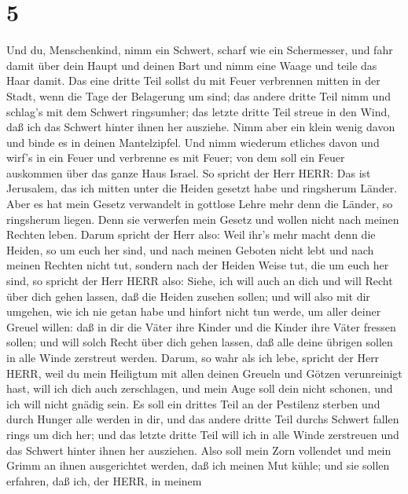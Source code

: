 \hypertarget{section-4}{%
\section{5}\label{section-4}}

 Und du, Menschenkind, nimm ein Schwert, scharf wie ein
Schermesser, und fahr damit über dein Haupt und deinen Bart und nimm
eine Waage und teile das Haar damit.  Das eine dritte Teil
sollst du mit Feuer verbrennen mitten in der Stadt, wenn die Tage der
Belagerung um sind; das andere dritte Teil nimm und schlag's mit dem
Schwert ringsumher; das letzte dritte Teil streue in den Wind, daß ich
das Schwert hinter ihnen her ausziehe.  Nimm aber ein klein
wenig davon und binde es in deinen Mantelzipfel.  Und nimm
wiederum etliches davon und wirf's in ein Feuer und verbrenne es mit
Feuer; von dem soll ein Feuer auskommen über das ganze Haus Israel.
 So spricht der Herr HERR: Das ist Jerusalem, das ich mitten
unter die Heiden gesetzt habe und ringsherum Länder.  Aber
es hat mein Gesetz verwandelt in gottlose Lehre mehr denn die Länder, so
ringsherum liegen. Denn sie verwerfen mein Gesetz und wollen nicht nach
meinen Rechten leben.  Darum spricht der Herr also: Weil
ihr's mehr macht denn die Heiden, so um euch her sind, und nach meinen
Geboten nicht lebt und nach meinen Rechten nicht tut, sondern nach der
Heiden Weise tut, die um euch her sind,  so spricht der Herr
HERR also: Siehe, ich will auch an dich und will Recht über dich gehen
lassen, daß die Heiden zusehen sollen;  und will also mit
dir umgehen, wie ich nie getan habe und hinfort nicht tun werde, um
aller deiner Greuel willen:  daß in dir die Väter ihre
Kinder und die Kinder ihre Väter fressen sollen; und will solch Recht
über dich gehen lassen, daß alle deine übrigen sollen in alle Winde
zerstreut werden.  Darum, so wahr als ich lebe, spricht der
Herr HERR, weil du mein Heiligtum mit allen deinen Greueln und Götzen
verunreinigt hast, will ich dich auch zerschlagen, und mein Auge soll
dein nicht schonen, und ich will nicht gnädig sein.  Es
soll ein drittes Teil an der Pestilenz sterben und durch Hunger alle
werden in dir, und das andere dritte Teil durchs Schwert fallen rings um
dich her; und das letzte dritte Teil will ich in alle Winde zerstreuen
und das Schwert hinter ihnen her ausziehen.  Also soll mein
Zorn vollendet und mein Grimm an ihnen ausgerichtet werden, daß ich
meinen Mut kühle; und sie sollen erfahren, daß ich, der HERR, in meinem
